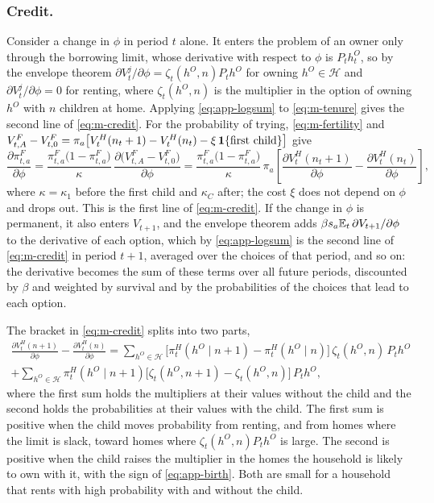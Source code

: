 \subsubsection*{Credit.}
Consider a change in $\phi$ in period $t$ alone. It enters the problem of an
owner only through the borrowing limit, whose derivative with respect to
$\phi$ is $P_th^O_t$, so by the envelope theorem
$\partial V^j_t/\partial\phi=\zeta_t(h^O,n)P_th^O$ for owning
$h^O\in\mathcal H$ and $\partial V^j_t/\partial\phi=0$ for renting, where
$\zeta_t(h^O,n)$ is the multiplier in the option of owning $h^O$ with $n$
children at home. Applying \eqref{eq:app-logsum} to \eqref{eq:m-tenure}
gives the second line of \eqref{eq:m-credit}. For the probability of trying,
\eqref{eq:m-fertility} and
$V^F_{t,A}-V^F_{t,0}=\pi_a\bigl[V^H_t(n_t+1)-V^H_t(n_t)-\xi\,\mathbf 1\{\text{first child}\}\bigr]$
give
\begin{equation}
 \frac{\partial\pi^F_{t,a}}{\partial\phi}
 =\frac{\pi^F_{t,a}\bigl(1-\pi^F_{t,a}\bigr)}{\kappa}\,
 \frac{\partial\bigl(V^F_{t,A}-V^F_{t,0}\bigr)}{\partial\phi}
 =\frac{\pi^F_{t,a}\bigl(1-\pi^F_{t,a}\bigr)}{\kappa}\,\pi_a
 \left[\frac{\partial V^H_t(n_t+1)}{\partial\phi}-\frac{\partial V^H_t(n_t)}{\partial\phi}\right],
 \label{eq:app-credit-pi}
\end{equation}
where $\kappa=\kappa_1$ before the first child and $\kappa_C$ after; the
cost $\xi$ does not depend on $\phi$ and drops out. This is the first line
of \eqref{eq:m-credit}. If the change in $\phi$ is permanent, it also enters
$V_{t+1}$, and the envelope theorem adds
$\beta s_a\mathbb E_t\,\partial V_{t+1}/\partial\phi$ to the derivative of each
option, which by \eqref{eq:app-logsum} is the second line of
\eqref{eq:m-credit} in period $t+1$, averaged over the choices of that
period, and so on: the derivative becomes the sum of these terms over all
future periods, discounted by $\beta$ and weighted by survival and by the
probabilities of the choices that lead to each option.

The bracket in \eqref{eq:m-credit} splits into two parts,
\begin{multline}
 \frac{\partial V^H_t(n+1)}{\partial\phi}-\frac{\partial V^H_t(n)}{\partial\phi}
 =\sum_{h^O\in\mathcal H}\bigl[\pi^H_t(h^O\mid n+1)-\pi^H_t(h^O\mid n)\bigr]\,\zeta_t(h^O,n)\,P_th^O\\
 +\sum_{h^O\in\mathcal H}\pi^H_t(h^O\mid n+1)\bigl[\zeta_t(h^O,n+1)-\zeta_t(h^O,n)\bigr]\,P_th^O ,
 \label{eq:app-credit-decomp}
\end{multline}
where the first sum holds the multipliers at their values without the child
and the second holds the probabilities at their values with the child. The
first sum is positive when the child moves probability from renting, and
from homes where the limit is slack, toward homes where
$\zeta_t(h^O,n)P_th^O$ is large. The second is positive when the child
raises the multiplier in the homes the household is likely to own with it,
with the sign of \eqref{eq:app-birth}. Both are small for a household that
rents with high probability with and without the child.

